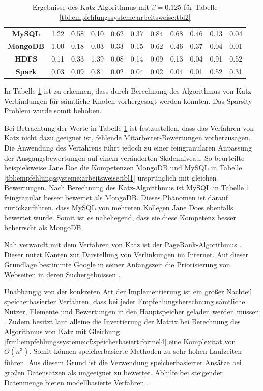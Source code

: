 \begin{table}[h]
\begin{tabular}{c|c|c|c|c|c|c|c|c|c|c}
		\textbf{MySQL}    & 1.22 & 0.58 & 0.10 & 0.62 & 0.37 & 0.84 & 0.68 & 0.46 & 0.13 & 0.04\\
		\textbf{MongoDB}  & 1.00 & 0.18 & 0.03 & 0.33 & 0.15 & 0.62 & 0.46 & 0.37 & 0.04 & 0.01\\
		\textbf{HDFS}     & 0.11 & 0.33 & 1.39 & 0.08 & 0.14 & 0.09 & 0.13 & 0.04 & 0.91 & 0.52\\
		\textbf{Spark}    & 0.03 & 0.09 & 0.81 & 0.02 & 0.04 & 0.02 & 0.04 & 0.01 & 0.52 & 0.31
	\end{tabular}
	\caption{Ergebnisse des Katz-Algorithmus mit $\beta = 0.125$ für Tabelle \ref{tbl:empfehlungssysteme:arbeitsweise:tbl2}}
	\label{tbl:empfehlungssysteme:arbeitsweise:tbl3}
\end{table}

In Tabelle \ref{tbl:empfehlungssysteme:arbeitsweise:tbl3} ist zu erkennen, dass durch Berechnung des Algorithmus von Katz Verbindungen für sämtliche Knoten vorhergesagt werden konnten. Das Sparsity Problem wurde somit behoben.

Bei Betrachtung der Werte in Tabelle \ref{tbl:empfehlungssysteme:arbeitsweise:tbl3} ist festzustellen, dass das Verfahren von Katz nicht dazu geeignet ist, fehlende Mitarbeiter-Bewertungen vorherzusagen. Die Anwendung des Verfahrens führt jedoch zu einer feingranularen Anpassung der Ausgangsbewertungen auf einem veränderten Skalenniveau. So beurteilte beispielsweise Jane Doe die Kompetenzen MongoDB und MySQL in Tabelle \ref{tbl:empfehlungssysteme:arbeitsweise:tbl1} ursprünglich mit gleichen Bewertungen. Nach Berechnung des Katz-Algorithmus ist MySQL in Tabelle \ref{tbl:empfehlungssysteme:arbeitsweise:tbl3} feingranular besser bewertet als MongoDB. Dieses Phänomen ist darauf zurückzuführen, dass MySQL von mehreren Kollegen Jane Does ebenfalls bewertet wurde. Somit ist es naheliegend, dass sie diese Kompetenz besser beherrscht als MongoDB.

Nah verwandt mit dem Verfahren von Katz ist der PageRank-Algorithmus \cite[S. 1]{was:2018}. Dieser nutzt Kanten zur Darstellung von Verlinkungen im Internet. Auf dieser Grundlage bestimmte Google in seiner Anfangszeit die Priorisierung von Webseiten in deren Suchergebnissen \cite[S. 3ff.]{page:1999}.

Unabhängig von der konkreten Art der Implementierung ist ein großer Nachteil speicherbasierter Verfahren, dass bei jeder Empfehlungsberechnung sämtliche Nutzer, Elemente und Bewertungen in den Hauptspeicher geladen werden müssen \cite[S. 8]{yang:2016}. Zudem besitzt laut \textcite[S. 3]{landherr:2010} alleine die Invertierung der Matrix bei Berechnung des Algorithmus von Katz mit Gleichung \ref{frml:empfehlungssysteme:cf:speicherbasiert:formel4} eine Komplexität von $O(n^3)$. Somit können speicherbasierte Methoden zu sehr hohen Laufzeiten führen. Aus diesem Grund ist die Verwendung speicherbasierter Ansätze bei großen Datensätzen als ungeeignet zu bewertet. Abhilfe bei steigender Datenmenge bieten modellbasierte Verfahren \cite[S. 8]{yang:2016}.

